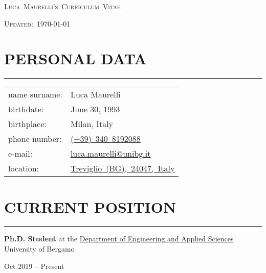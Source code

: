 \documentclass[10pt]{article}
\newcommand{\cvsection}[1]{\section*{\centering\normalsize\uppercase{#1}}\vspace{-16pt}\rule{\linewidth}{0.2pt}\vspace{6pt}}
\begin{document}
\pagestyle{empty}

\centering
{\huge\textsc{Luca~Maurelli's~Curriculum~Vitae}\par}
{\textsc{Updated:~}\today\par}
\raggedright
\vspace{1cm}

\cvsection{personal data}

\noindent
\begin{minipage}[t]{.5\textwidth}
	\raggedright
	\begin{tabular}{@{}ll@{}}
	name surname: & Luca Maurelli\\
	birthdate: & June 30, 1993 \\
	birthplace: & Milan, Italy \\
	phone number: & \href{tel:+393408192088}{(+39)~340~8192088} \\
	e-mail: & \href{mailto:luca.maurelli@unibg.it}{luca.maurelli@unibg.it} \\
	location: & \href{https://goo.gl/maps/qSb6hkSyAdgnEt5w7}{Treviglio~(BG),~24047,~Italy}
	\end{tabular}
\end{minipage}%
\begin{minipage}[t]{.5\textwidth}
	\raggedleft
\end{minipage}

\cvsection{current position}

\noindent
\begin{minipage}[t]{.8\textwidth}
	\textbf{Ph.D. Student} at the \href{https://disa.unibg.it/}{Department of Engineering and Applied Sciences} \\
	University of Bergamo
\end{minipage}%
\hfill\vrule\hfill
\begin{minipage}[t]{.16\textwidth}
	\raggedleft
	Oct 2019 – Present
\end{minipage}
\end{document}
